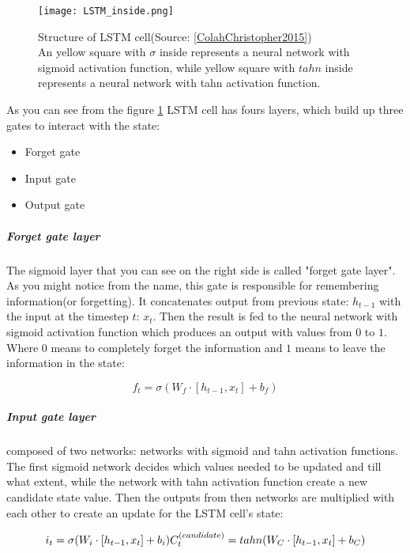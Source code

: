 \begin{figure}[H]
	\texttt{[image: LSTM\_inside.png]}
	\caption{
		Structure of LSTM cell(Source: \ref{ColahChristopher2015}) \\
		An yellow square with $\sigma$ inside represents a neural
		network with sigmoid activation function, while yellow square with $tahn$ inside represents
		a neural network with tahn activation function.
		}
	\label{img:lstm} %
\end{figure}


As you can see from the figure \ref{img:lstm} LSTM cell has fours layers,
which build up three gates to interact with the state:
\begin{itemize}
	\item Forget gate
	\item Input gate
	\item Output gate
\end{itemize}


\subparagraph{Forget gate layer}
The sigmoid layer that you can see on the right side is
called "forget gate layer". As you might notice from the name, this gate is responsible
for remembering information(or forgetting). It concatenates output from previous state: $h_{t-1}$
with the input at the timestep $t$: $x_t$. Then the result is fed to the neural network
with sigmoid activation function which produces an output with values from $0$ to $1$.
Where 0 means to completely forget the information and $1$ means to leave
the information in the state:

\begin{equation} \label{eq:forget_gate}
	f_t = \sigma (W_f \cdot [h_{t-1}, x_t] + b_f)
\end{equation}

\subparagraph{Input gate layer} composed of two networks: networks with sigmoid
and tahn activation functions. The first sigmoid network decides which values needed
to be updated and till what extent, while the network with tahn activation function create a
new candidate state value. Then the outputs from then networks are multiplied with each other
to create an update for the LSTM cell's state:

\begin{equation} \label{eq:input_gate}
	i_t = \sigma (W_i \cdot [h_{t-1}, x_t] + b_i) \\
	C_t^{(candidate)} = tahn(W_C \cdot [h_{t-1}, x_t] + b_C)
\end{equation}

